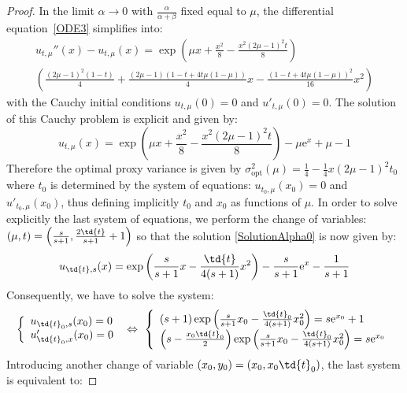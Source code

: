 \documentclass[15pt]{article}
\newcommand{\edr}{\mathrm{e}}
\theoremstyle{plain}
\begin{document}
\begin{proof}
In the limit $\alpha\to 0$ with $\frac{\alpha}{\alpha+\beta}$ fixed equal to $\mu$, the differential equation~\eqref{ODE3} simplifies into: %
\begin{multline*} 
u_{t,\mu}''(x)-u_{t,\mu}(x) = \exp\left(\mu x+\frac{x^2}{8}-\frac{x^2(2\mu-1)^2t}{8}\right)\\
\left(\frac{(2\mu-1)^2(1-t)}{4}+\frac{(2\mu-1)(1-t+4t\mu(1-\mu))}{4}x-\frac{(1-t+4t\mu(1-\mu))^2}{16}x^2\right)
\end{multline*}
with the Cauchy initial conditions $u_{t,\mu}(0)=0$ and $u'_{t,\mu}(0)=0$. The solution of this Cauchy problem is explicit and given by:
\begin{equation} \label{SolutionAlpha0} u_{t,\mu}(x)= \exp\left(\mu x+\frac{x^2}{8}-\frac{x^2(2\mu-1)^2t}{8}\right) -\mu \edr^{x}+\mu-1
\end{equation}
Therefore the optimal proxy variance is given by $\sigma_{\text{opt}}^2(\mu)=\frac{1}{4}-\frac{1}{4}x(2\mu-1)^2t_0$ where $t_0$ is determined by the system of equations: $u_{t_0,\mu}(x_0)=0$ and $u'_{t_0,\mu}(x_0)$, thus defining implicitly $t_0$ and $x_0$ as functions of $\mu$. In order to solve explicitly the last system of equations, we perform the change of variables: $(\mu,t)=\left(\frac{s}{s+1},\frac{2\td{t}}{s+1}+1\right)$ so that the solution \eqref{SolutionAlpha0} is now given by:
\begin{equation*} 
u_{\td{t},s}(x)=\exp\left(\frac{s}{s+1}x-\frac{\td{t}}{4(s+1)}x^2\right)-\frac{s}{s+1}\edr^{x}-\frac{1}{s+1}
\end{equation*}
Consequently, we have to solve the system:
\begin{equation*}
\left\{
\begin{array}{l}
 u_{\td{t}_0,s}(x_0)=0 \\  
 u'_{\td{t}_0,x}(x_0)=0
\end{array}
\right.
\,\,\Leftrightarrow \,\, \left\{\begin{array}{l}
 (s+1)\exp\left(\frac{s}{s+1}x_0-\frac{\td{t}_0}{4(s+1)}x_0^2\right)=s\edr^{x_0}+1 \\  
 \left(s-\frac{x_0\td{t}_0}{2}\right)\exp\left(\frac{s}{s+1}x_0-\frac{\td{t}_0}{4(s+1)}x_0^2\right)=s\edr^{x_0}
\end{array}
\right.
\end{equation*}
Introducing another change of variable $(x_0,y_0)=(x_0,x_0\td{t}_0)$, the last system is equivalent to:

\end{proof}
\end{document}
